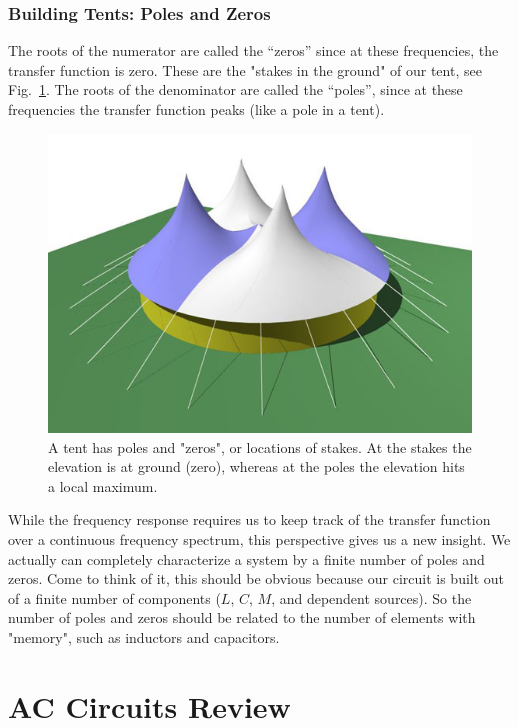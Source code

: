 \subsubsection{Building Tents: Poles and Zeros}

The roots of the numerator are called the “zeros” since at these frequencies, the transfer function is zero.  These are the "stakes in the ground" of our tent, see Fig.~\ref{fig:tent}.  	The roots of the denominator are called the “poles”, since at these frequencies the transfer function peaks (like a pole in a tent).
	 
\begin{figure}[tb]
\begin{center}
\includegraphics[angle=-0.0,width=.8\columnwidth]{image_11.jpg}
\end{center}
\caption{A tent has poles and "zeros", or locations of stakes.  At the stakes the elevation is at ground (zero), whereas at the poles the elevation hits a local maximum. } \label{fig:tent}
\end{figure}

While the frequency response requires us to keep track of the transfer function over a continuous frequency spectrum, this perspective gives us a new insight.  We actually can completely characterize a system by a finite number of poles and zeros.  Come to think of it, this should be obvious because our circuit is built out of a finite number of components ($L$, $C$, $M$, and dependent sources).  So the number of poles and zeros should be related to the number of elements with "memory", such as inductors and capacitors.  



\section{AC Circuits Review}



